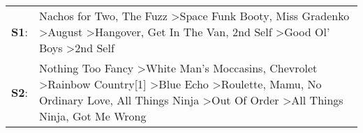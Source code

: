 \begin{supertabular}{p{0.03\textwidth}p{0.92\textwidth}}
 \textbf{S1}:  &                                                                                                                          Nachos for Two\textsuperscript{}, \enspace The Fuzz\textsuperscript{} \textgreater \enspace Space Funk Booty\textsuperscript{}, \enspace Miss Gradenko\textsuperscript{} \textgreater \enspace August\textsuperscript{} \textgreater \enspace Hangover\textsuperscript{}, \enspace Get In The Van\textsuperscript{}, \enspace 2nd Self\textsuperscript{} \textgreater \enspace Good Ol' Boys\textsuperscript{} \textgreater \enspace 2nd Self\textsuperscript{}  \enspace  \\
 \textbf{S2}:  &  Nothing Too Fancy\textsuperscript{} \textgreater \enspace White Man's Moccasins\textsuperscript{}, \enspace Chevrolet\textsuperscript{} \textgreater \enspace Rainbow Country[1]\textsuperscript{} \textgreater \enspace Blue Echo\textsuperscript{} \textgreater \enspace Roulette\textsuperscript{}, \enspace Mamu\textsuperscript{}, \enspace No Ordinary Love\textsuperscript{}, \enspace All Things Ninja\textsuperscript{} \textgreater \enspace Out Of Order\textsuperscript{} \textgreater \enspace All Things Ninja\textsuperscript{}, \enspace Got Me Wrong\textsuperscript{}  \enspace  \\
\end{supertabular}
